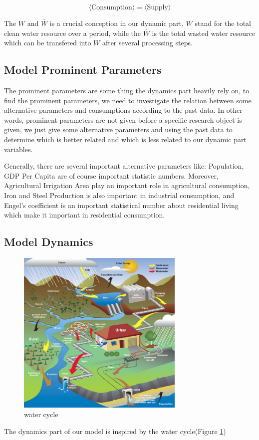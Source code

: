     $$
    \langle \text{Consumption}\rangle = \langle \text{Supply} \rangle
    $$

    The $W$ and $\bar{W}$ is a crucial conception in our dynamic part, $W$ stand for the total clean water resource over a period, while the $\bar{W}$ is the total wasted water resource which can be transfered into $W$ after several processing steps.

  \subsection{Model Prominent Parameters}

    The prominent parameters are some thing the dynamics part heavily rely on, to find the prominent parameters, we need to investigate the relation between some alternative parameters and consumptions according to the past data. In other words, prominent parameters are not given before a specific research object is given, we just give some alternative parameters and using the past data to determine which is better related and which is less related to our dynamic part variables.

    Generally, there are several important alternative parameters like: Population, GDP Per Capita are of course important statistic numbers. Moreover, Agricultural Irrigation Area play an important role in agricultural consumption, Iron and Steel Production is also important in industrial consumption, and Engel's coefficient is an important statistical number about residential living which make it important in residential consumption.

  \subsection{Model Dynamics}

    \begin{figure}
    \includegraphics[width = 8cm]{picture/UrbanWaterCycle.jpg}
    \caption{water cycle\cite{WaterCycle}}
    \label{water cycle}
    \end{figure}
  The dynamics part of our model is inspired by the water cycle(Figure \ref{water cycle})

